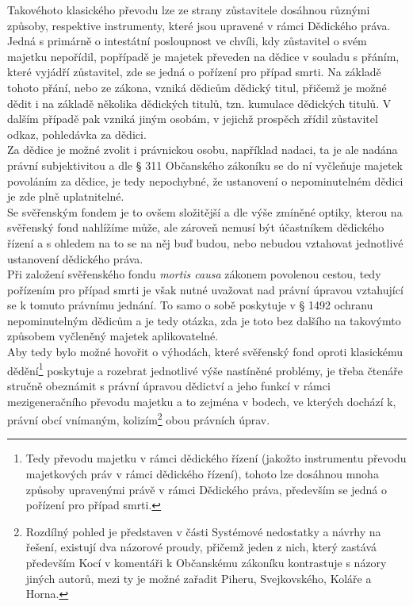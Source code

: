 \documentclass{article}
\begin{document}
Takovéhoto klasického převodu lze ze strany zůstavitele dosáhnou různými způsoby, respektive instrumenty, které jsou upravené v rámci Dědického práva. Jedná s primárně o intestátní posloupnost ve chvíli, kdy zůstavitel o svém majetku nepořídil, popřípadě je majetek převeden na dědice v souladu s přáním, které vyjádří zůstavitel, zde se jedná o pořízení pro případ smrti. Na základě tohoto přání, nebo ze zákona, vzniká dědicům dědický titul, přičemž je možné dědit i na základě několika dědických titulů, tzn. kumulace dědických titulů. V dalším případě pak vzniká jiným osobám, v jejichž prospěch zřídil zůstavitel odkaz, pohledávka za dědici.\\

Za dědice je možné zvolit i právnickou osobu, například nadaci, ta je ale nadána právní subjektivitou a dle § 311 Občanského zákoníku se do ní vyčleňuje majetek povoláním za dědice, je tedy nepochybné, že ustanovení o nepominutelném dědici je zde plně uplatnitelné.\\

Se svěřenským fondem je to ovšem složitější a dle výše zmíněné optiky, kterou na svěřenský fond nahlížíme může, ale zároveň nemusí být účastníkem dědického řízení a s ohledem na to se na něj buď budou, nebo nebudou vztahovat jednotlivé ustanovení dědického práva.\\

Při založení svěřenského fondu \textit{mortis causa} zákonem povolenou cestou, tedy pořízením pro případ smrti je však nutné uvažovat nad právní úpravou vztahující se k tomuto právnímu jednání. To samo o sobě poskytuje v § 1492 ochranu nepominutelným dědicům a je tedy otázka, zda je toto bez dalšího na takovýmto způsobem vyčleněný majetek aplikovatelné.\\



Aby tedy bylo možné hovořit o výhodách, které svěřenský fond oproti klasickému dědění\footnote{Tedy převodu majetku v rámci dědického řízení (jakožto instrumentu převodu majetkových práv v rámci dědického řízení), tohoto lze dosáhnou mnoha způsoby upravenými právě v rámci Dědického práva, především se jedná o pořízení pro případ smrti.} poskytuje a rozebrat jednotlivé výše nastíněné problémy, je třeba čtenáře stručně obeznámit s právní úpravou dědictví a jeho funkcí v rámci mezigeneračního převodu majetku a to zejména v bodech, ve kterých dochází k, právní obcí vnímaným, kolizím\footnote{Rozdílný pohled je představen v části Systémové nedostatky a návrhy na řešení, existují dva názorové proudy, přičemž jeden z nich, který zastává především Kocí v komentáři k Občanskému zákoníku kontrastuje s názory jiných autorů, mezi ty je možné zařadit Piheru, Svejkovského, Koláře a Horna.} obou právních úprav.\\
\end{document}
